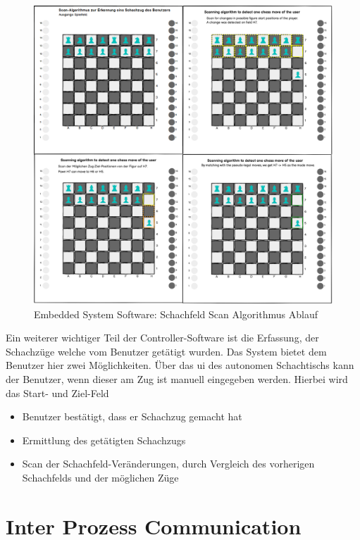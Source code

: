 \begin{figure}
\centering
\includegraphics{images/ATC_ChessMoveAlgorithm.png}
\caption{Embedded System Software: Schachfeld Scan Algorithmus Ablauf
\label{ATC_ChessMoveAlgorithm}}
\end{figure}

Ein weiterer wichtiger Teil der Controller-Software ist die Erfassung,
der Schachzüge welche vom Benutzer getätigt wurden. Das System bietet
dem Benutzer hier zwei Möglichkeiten. Über das \gls{ui} des autonomen
Schachtischs kann der Benutzer, wenn dieser am Zug ist manuell
eingegeben werden. Hierbei wird das Start- und Ziel-Feld

\begin{itemize}
\tightlist
\item
  Benutzer bestätigt, dass er Schachzug gemacht hat
\item
  Ermittlung des getätigten Schachzugs
\item
  Scan der Schachfeld-Veränderungen, durch Vergleich des vorherigen
  Schachfelds und der möglichen Züge
\end{itemize}

\hypertarget{inter-prozess-communication}{%
\section{Inter Prozess
Communication}\label{inter-prozess-communication}}

